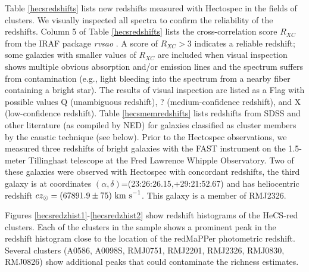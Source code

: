 Table \ref{hecsredshifts} lists \nczhecsred new redshifts measured 
with Hectospec in the fields of \nclusterhecsred clusters.  We visually inspected all spectra to confirm the reliability of 
the redshifts.  Column 5 of Table \ref{hecsredshifts} lists the cross-correlation
score $R_{XC}$ from the IRAF package {\em rvsao} \citep{km98}.  A score of 
$R_{XC}>3$ indicates a reliable redshift; some galaxies with smaller values 
of $R_{XC}$ are included when visual inspection shows multiple obvious 
absorption and/or emission lines and the spectrum suffers from contamination
(e.g., light bleeding into the spectrum from a nearby fiber containing a bright star). 
The results of visual inspection are listed as a Flag with possible values Q 
(unambiguous redshift), ? (medium-confidence redshift), and X (low-confidence redshift).
Table \ref{hecsmemredshifts} lists redshifts from SDSS 
and other literature (as compiled by NED) for galaxies classified as cluster 
members by the caustic technique (see below).  
Prior to the Hectospec observations, we measured three redshifts 
of bright galaxies with the 
FAST instrument \citep{fast} on the 
1.5-meter Tillinghast telescope at the Fred Lawrence Whipple Observatory.  
Two of these galaxies were observed with Hectospec with concordant redshifts, 
the third galaxy is at coordinates $(\alpha,\delta)$=(23:26:26.15,+29:21:52.67) 
and has heliocentric redshift $cz_\odot=(67891.9\pm75)~{\rm km~s}^{-1} $.  This galaxy is a 
member of RMJ2326. 

Figures \ref{hecsredzhist1}-\ref{hecsredzhist2} show redshift histograms of the HeCS-red clusters. 
Each of the clusters in the sample 
shows a prominent peak in the redshift histogram close to the location of the 
redMaPPer photometric redshift.  Several clusters (A0586, A0098S, RMJ0751, RMJ2201, RMJ2326, RMJ0830, RMJ0826)
show additional peaks  that could contaminate the richness estimates.


\begin{figure*} 
\caption{\label{hecsredzhist1} Redshift histograms for galaxies within 0.5 degrees of the cluster centers for the redMaPPer sample.  
Bins have width $\Delta z = 0.0025$. Red dashed lines indicate the photometric redshifts from redMaPPer.  
}
\end{figure*}

\begin{figure*} 
\caption{\label{hecsredzhist2} Redshift histograms for galaxies within 0.5 degree of the cluster centers for the redMaPPer sample.  
Bins have width $\Delta z = 0.0025$. Red dashed lines indicate the photometric redshifts from redMaPPer.
}
\end{figure*}

